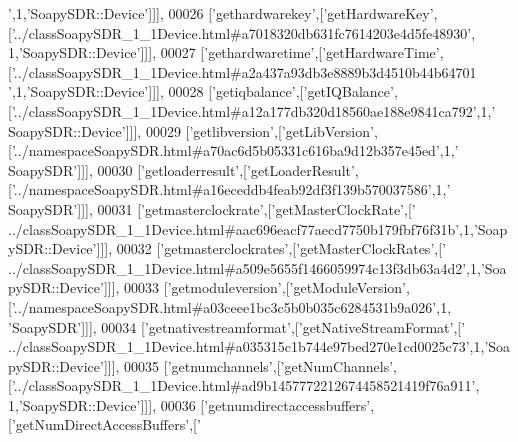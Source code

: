 \begin{DoxyCode}
{      '},1,\textcolor{stringliteral}{'SoapySDR::Device'}]]],
00026   [\textcolor{stringliteral}{'gethardwarekey'},[\textcolor{stringliteral}{'getHardwareKey'},[\textcolor{stringliteral}{'../classSoapySDR\_1\_1Device.html#a7018320db631fc7614203e4d5fe48930'},
      1,\textcolor{stringliteral}{'SoapySDR::Device'}]]],
00027   [\textcolor{stringliteral}{'gethardwaretime'},[\textcolor{stringliteral}{'getHardwareTime'},[\textcolor{stringliteral}{'../classSoapySDR\_1\_1Device.html#a2a437a93db3e8889b3d4510b44b64701
      '},1,\textcolor{stringliteral}{'SoapySDR::Device'}]]],
00028   [\textcolor{stringliteral}{'getiqbalance'},[\textcolor{stringliteral}{'getIQBalance'},[\textcolor{stringliteral}{'../classSoapySDR\_1\_1Device.html#a12a177db320d18560ae188e9841ca792'},1,\textcolor{stringliteral}{'
      SoapySDR::Device'}]]],
00029   [\textcolor{stringliteral}{'getlibversion'},[\textcolor{stringliteral}{'getLibVersion'},[\textcolor{stringliteral}{'../namespaceSoapySDR.html#a70ac6d5b05331c616ba9d12b357e45ed'},1,\textcolor{stringliteral}{'
      SoapySDR'}]]],
00030   [\textcolor{stringliteral}{'getloaderresult'},[\textcolor{stringliteral}{'getLoaderResult'},[\textcolor{stringliteral}{'../namespaceSoapySDR.html#a16eceddb4feab92df3f139b570037586'},1,\textcolor{stringliteral}{'
      SoapySDR'}]]],
00031   [\textcolor{stringliteral}{'getmasterclockrate'},[\textcolor{stringliteral}{'getMasterClockRate'},[\textcolor{stringliteral}{'
      ../classSoapySDR\_1\_1Device.html#aac696eacf77aecd7750b179fbf76f31b'},1,\textcolor{stringliteral}{'SoapySDR::Device'}]]],
00032   [\textcolor{stringliteral}{'getmasterclockrates'},[\textcolor{stringliteral}{'getMasterClockRates'},[\textcolor{stringliteral}{'
      ../classSoapySDR\_1\_1Device.html#a509e5655f1466059974c13f3db63a4d2'},1,\textcolor{stringliteral}{'SoapySDR::Device'}]]],
00033   [\textcolor{stringliteral}{'getmoduleversion'},[\textcolor{stringliteral}{'getModuleVersion'},[\textcolor{stringliteral}{'../namespaceSoapySDR.html#a03ceee1bc3c5b0b035c6284531b9a026'},1,\textcolor{stringliteral}{
      'SoapySDR'}]]],
00034   [\textcolor{stringliteral}{'getnativestreamformat'},[\textcolor{stringliteral}{'getNativeStreamFormat'},[\textcolor{stringliteral}{'
      ../classSoapySDR\_1\_1Device.html#a035315c1b744e97bed270e1cd0025c73'},1,\textcolor{stringliteral}{'SoapySDR::Device'}]]],
00035   [\textcolor{stringliteral}{'getnumchannels'},[\textcolor{stringliteral}{'getNumChannels'},[\textcolor{stringliteral}{'../classSoapySDR\_1\_1Device.html#ad9b1457772212674458521419f76a911'},
      1,\textcolor{stringliteral}{'SoapySDR::Device'}]]],
00036   [\textcolor{stringliteral}{'getnumdirectaccessbuffers'},[\textcolor{stringliteral}{'getNumDirectAccessBuffers'},[\textcolor{stringliteral}{'
}
\end{DoxyCode}

